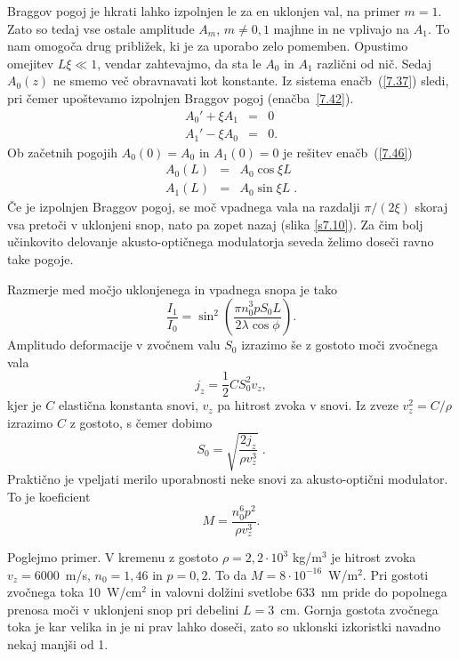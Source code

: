 Braggov pogoj je hkrati lahko izpolnjen le za en uklonjen val, na
primer $m=1$. Zato so tedaj vse ostale amplitude $A_{m}$, $m\ne0,1$
majhne in ne vplivajo na $A_{1}$. To nam omogoča drug približek,
ki je za uporabo zelo pomemben. Opustimo omejitev $L\xi\ll 1$, vendar
zahtevajmo, da sta le $A_{0}$ in $A_{1}$ različni od nič. Sedaj
$A_{0}(z)$ ne smemo več obravnavati kot konstante. Iz sistema enačb~(\ref{7.37})
sledi, pri čemer upoštevamo izpolnjen Braggov pogoj (enačba~\ref{7.42}).
\begin{eqnarray}
A_{0}'+\xi A_{1} & = & 0\nonumber \\
A_{1}'-\xi A_{0} & = & 0.
\end{eqnarray}
Ob začetnih pogojih $A_{0}(0)=A_{0}$ in $A_{1}(0)=0$ je rešitev enačb~(\ref{7.46}) 
\begin{eqnarray}
A_{0}(L) & = & A_{0}\cos\xi L\nonumber \\
A_{1}(L) & = & A_{0}\sin\xi L\;.
\end{eqnarray}
Če je izpolnjen Braggov pogoj, se moč vpadnega vala na razdalji $\pi/(2\xi)$
skoraj vsa pretoči v uklonjeni snop, nato pa zopet nazaj (slika \ref{s7.10}).
Za čim bolj učinkovito delovanje akusto-optičnega modulatorja seveda
želimo doseči ravno take pogoje.

Razmerje med močjo uklonjenega in vpadnega snopa je tako
\begin{equation}
\frac{I_{1}}{I_{0}}=\sin^{2}\left(\frac{\pi n_{0}^{3}pS_{0}L}{2\lambda\cos\phi}\right).
\label{7.48}
\end{equation}
Amplitudo deformacije v zvočnem valu $S_0$ izrazimo še z gostoto moči zvočnega vala 
\begin{equation}
j_{z}=\frac{1}{2}CS_{0}^{2}v_{z},
\label{7.49}
\end{equation}
kjer je $C$ elastična konstanta snovi, $v_z$ pa hitrost zvoka v snovi. 
Iz zveze $v_{z}^{2}=C/\rho$ izrazimo $C$ z gostoto, s čemer dobimo 
\begin{equation}
S_{0}=\sqrt{\frac{2j_{z}}{\rho v_{z}^{3}}}\;.\label{7.50}
\end{equation}
Praktično je vpeljati merilo uporabnosti neke snovi za akusto-optični modulator. To je koeficient 
\begin{equation}
M=\frac{n_{0}^{6}p^{2}}{\rho v_{z}^{3}}.
\label{7.51}
\end{equation}

Poglejmo primer. V kremenu z gostoto $\rho=2,2\cdot10^{3}$ kg/m$^{3}$ je hitrost zvoka $v_{z}=6000$~m/s,
$n_{0}=1,46$ in $p=0,2$. To da $M=8\cdot10^{-16}$~W/m$^{2}$.
Pri gostoti zvočnega toka 10~W/cm$^{2}$ in valovni dolžini svetlobe 633~nm
pride do popolnega prenosa moči v uklonjeni snop pri debelini $L=3$~cm. Gornja gostota
zvočnega toka je kar velika in je ni prav lahko doseči, zato so 
uklonski izkoristki navadno nekaj manjši od 1.

